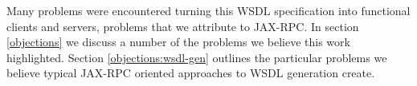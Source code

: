 Many problems were encountered turning this WSDL specification into
functional clients and servers, problems that we attribute to JAX-RPC.
In section \ref{objections} we discuss a number of the problems we
believe this work highlighted. Section \ref{objections:wsdl-gen}
outlines the particular problems we believe typical JAX-RPC oriented
approaches to WSDL generation create.





